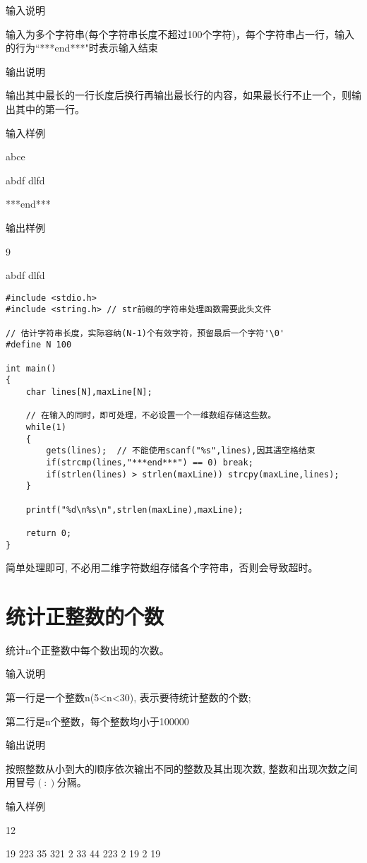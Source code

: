 输入说明	

输入为多个字符串(每个字符串长度不超过100个字符)，每个字符串占一行，输入的行为``***end***"时表示输入结束

输出说明
	
输出其中最长的一行长度后换行再输出最长行的内容，如果最长行不止一个，则输出其中的第一行。

输入样例
	
abce

abdf dlfd

***end***

输出样例
	
9

abdf dlfd 

\begin{lstlisting}
#include <stdio.h>
#include <string.h> // str前缀的字符串处理函数需要此头文件 

// 估计字符串长度，实际容纳(N-1)个有效字符，预留最后一个字符'\0' 
#define N 100

int main()
{
	char lines[N],maxLine[N];
	
	// 在输入的同时，即可处理，不必设置一个一维数组存储这些数。
	while(1)
	{
		gets(lines);  // 不能使用scanf("%s",lines),因其遇空格结束 
		if(strcmp(lines,"***end***") == 0) break;
		if(strlen(lines) > strlen(maxLine)) strcpy(maxLine,lines);
	}
	
	printf("%d\n%s\n",strlen(maxLine),maxLine); 
	
	return 0;
} 
\end{lstlisting}

\begin{note}[要点]
	简单处理即可, 不必用二维字符数组存储各个字符串，否则会导致超时。
\end{note}

\section{统计正整数的个数}
统计n个正整数中每个数出现的次数。

输入说明	

第一行是一个整数n(5<n<30), 表示要待统计整数的个数;

第二行是n个整数，每个整数均小于100000

输出说明
	
按照整数从小到大的顺序依次输出不同的整数及其出现次数, 整数和出现次数之间用冒号$(:)$分隔。

输入样例	

12
 
19 223 35 321 2 33 44 223 2 19 2 19

